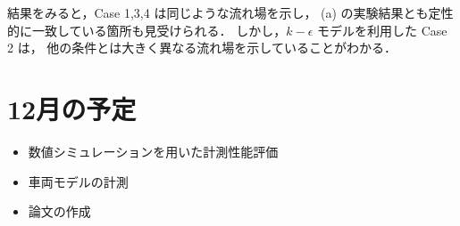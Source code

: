 \documentclass[twocolumn,a4j]{jsarticle}
\begin{document}
結果をみると，Case 1,3,4 は同じような流れ場を示し，
(a) の実験結果とも定性的に一致している箇所も見受けられる．
しかし，$k-\epsilon$ モデルを利用した Case 2 は，
他の条件とは大きく異なる流れ場を示していることがわかる．

\section{12月の予定}
\begin{itemize}
	\item 数値シミュレーションを用いた計測性能評価
	\item 車両モデルの計測
	\item 論文の作成
\end{itemize}

\newpage
\begin{figure}[htbp]

\end{figure}
\end{document}
